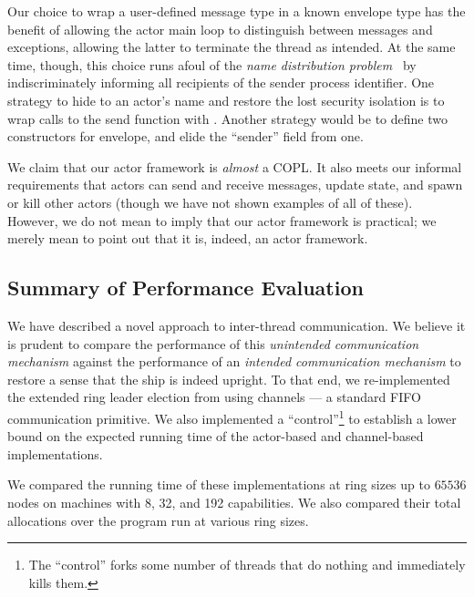\documentclass[sigplan,screen]{acmart}
\begin{document}
Our choice to wrap a user-defined message type in a known envelope type has the
benefit of allowing the actor main loop to distinguish between messages and
exceptions, allowing the latter to terminate the thread as intended.
%
At the same time, though, this choice runs afoul of the \emph{name distribution problem}~\cite{armstrong2003} by indiscriminately informing all recipients of the sender
process identifier.
%
One strategy to hide to an actor's name and restore the lost security isolation is
to wrap calls to the send function with .
%
Another strategy would be to define two constructors for envelope, and elide
the ``sender'' field from one.

We claim that our actor framework is \emph{almost} a COPL.
%
It also meets our informal requirements that actors can send and receive
messages, update state, and spawn or kill other actors (though we have not
shown examples of all of these).
%
However, we do not mean to imply that our actor framework is practical; we
merely mean to point out that it is, indeed, an actor framework.





\subsection{Summary of Performance Evaluation}

We have described a novel approach to inter-thread communication.
%
We believe it
is prudent to compare the performance of this \emph{unintended communication
mechanism} against the performance of an \emph{intended communication
mechanism} to restore a sense that the ship is indeed upright.
%
To that end,
we re-implemented the extended ring leader election from 
using channels --- a standard FIFO communication primitive.
%
We also implemented a ``control''\footnote{
    The ``control'' forks some number of threads that do nothing and
    immediately kills them.
} to establish a lower bound on the expected
running time of the actor-based and channel-based implementations.

%
We compared the running time of these implementations
at ring sizes up to $65536$ nodes on machines with 8, 32, and 192
capabilities.
%
We also compared their total allocations over the program run at various ring
sizes.
\end{document}
